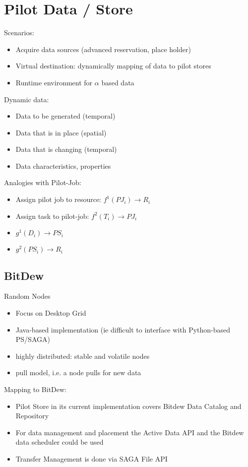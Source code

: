 \documentclass[]{article}
\begin{document}
\section{Pilot Data / Store}
\noindent
Scenarios:
\begin{itemize}
	\item Acquire data sources (advanced reservation, place holder)
	\item Virtual destination: dynamically mapping of data to pilot stores
	\item Runtime environment for $\alpha$ based data
\end{itemize}
	
\noindent	
Dynamic data:
\begin{itemize}
	\item Data to be generated (temporal)
	\item Data that is in place (spatial)
	\item Data that is changing (temporal)
	\item Data characteristics, properties
\end{itemize}	

\noindent
Analogies with Pilot-Job:
\begin{itemize}
	\item Assign pilot job to resource: $f^{1}(PJ_i) \rightarrow R_i$
	\item Assign task to pilot-job: $f^{2}(T_i) \rightarrow PJ_i$ 

	\item $g^{1} (D_i) \rightarrow PS_i$
	\item $g^{2} (PS_i) \rightarrow R_i$
\end{itemize}

\subsection{BitDew}

Random Nodes
\begin{itemize}
	\item Focus on Desktop Grid
	\item Java-based implementation (ie difficult to interface with Python-based PS/SAGA)
	\item highly distributed: stable and volatile nodes
	\item pull model, i.e. a node pulls for new data
\end{itemize}


Mapping to BitDew:
\begin{itemize}
	\item Pilot Store in its current implementation covers Bitdew Data Catalog and Repository
	\item For data management and placement the Active Data API and the Bitdew data scheduler could be used
	\item Transfer Management is done via SAGA File API	
\end{itemize}
\end{document}
